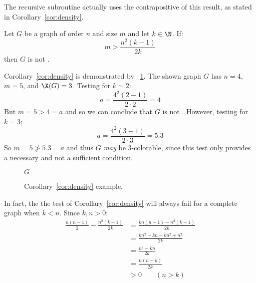 The recursive subroutine actually uses the contrapositive of this result, as stated in Corollary~\ref{cor:density}.

\begin{corollary}
  \label{cor:density}
  Let \(G\) be a graph of order \(n\) and size \(m\) and let \(k\in\N\).  If:
  \[m>\frac{n^2(k-1)}{2k}\]
  then \(G\) is not .
\end{corollary}

Corollary~\ref{cor:density} is demonstrated by \figurename~\ref{fig:density}.  The shown graph \(G\) has \(n=4\),
\(m=5\), and \(\X(G)=3\).  Testing for \(k=2\):
\[a=\frac{4^2(2-1)}{2\cdot2}=4\]
But \(m=5>4=a\) and so we can conclude that \(G\) is not .  However, testing for \(k=3\);
\[a=\frac{4^2(3-1)}{2\cdot3}=5.3\]
So \(m=5\ngtr5.3=a\) and thus \(G\) \emph{may} be \(3\)-colorable, since this test only provides a necessary and
not a sufficient condition.

\begin{figure}[H]
  \centering

  \(G\)
  \caption{Corollary~\ref{cor:density} example.}
  \label{fig:density}
\end{figure}

In fact, the the test of Corollary~\ref{cor:density} will always fail for a complete graph when \(k<n\).  Since
\(k,n>0\):
\begin{align*}
  \frac{n(n-1)}{2}-\frac{n^2(k-1)}{2k} &= \frac{kn(n-1)-n^2(k-1)}{2k} \\
  &= \frac{kn^2-kn-kn^2+n^2}{2k} \\
  &= \frac{n^2-kn}{2k} \\
  &= \frac{n(n-k)}{2k} \\
  &>0\qquad(n>k)
\end{align*}


